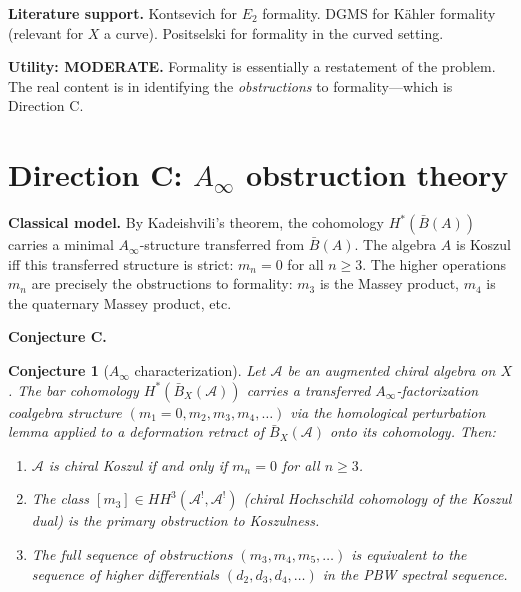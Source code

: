 \documentclass[11pt]{article}
\newtheorem{conjecture}{Conjecture}
\theoremstyle{remark}
\newcommand{\cA}{\mathcal{A}}
\newcommand{\barB}{\bar{B}}
\begin{document}
\textbf{Literature support.}  Kontsevich \cite{Kon03} for $E_2$ formality.  DGMS \cite{DGMS75} for K\"ahler formality (relevant for $X$ a curve).  Positselski \cite{Positselski11} for formality in the curved setting.

\textbf{Utility: MODERATE.}  Formality is essentially a restatement of the problem.  The real content is in identifying the \emph{obstructions} to formality---which is Direction C.

\section{Direction C: $A_\infty$ obstruction theory}

\textbf{Classical model.}  By Kadeishvili's theorem, the cohomology $H^*(\barB(A))$ carries a minimal $A_\infty$-structure transferred from $\barB(A)$.  The algebra $A$ is Koszul iff this transferred structure is strict: $m_n = 0$ for all $n \geq 3$.  The higher operations $m_n$ are precisely the obstructions to formality: $m_3$ is the Massey product, $m_4$ is the quaternary Massey product, etc.

\textbf{Conjecture C.}
\begin{conjecture}[$A_\infty$ characterization]\label{conj:ainfty}
Let $\cA$ be an augmented chiral algebra on $X$.  The bar cohomology $H^*(\barB_X(\cA))$ carries a transferred $A_\infty$-factorization coalgebra structure $(m_1 = 0, m_2, m_3, m_4, \ldots)$ via the homological perturbation lemma applied to a deformation retract of $\barB_X(\cA)$ onto its cohomology.  Then:
\begin{enumerate}[label=(\roman*)]
\item $\cA$ is chiral Koszul if and only if $m_n = 0$ for all $n \geq 3$.
\item The class $[m_3] \in HH^3(\cA^!, \cA^!)$ (chiral Hochschild cohomology of the Koszul dual) is the primary obstruction to Koszulness.
\item The full sequence of obstructions $(m_3, m_4, m_5, \ldots)$ is equivalent to the sequence of higher differentials $(d_2, d_3, d_4, \ldots)$ in the PBW spectral sequence.
\end{enumerate}
\end{conjecture}
\end{document}
